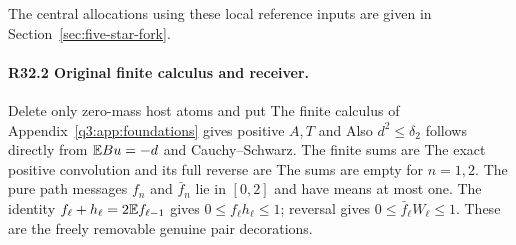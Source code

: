 The central allocations using these local reference inputs are
given in Section~\ref{sec:five-star-fork}.

\paragraph{R32.2 Original finite calculus and receiver.}
Delete only zero-mass host atoms and put
The finite calculus of Appendix~\ref{q3:app:foundations} gives positive \(A,\allowbreak T\) and
Also \(d^2\le\delta_2\) follows directly from \(\mathbb E Bu=-d\) and
Cauchy--Schwarz. The finite sums are
The exact positive convolution and its full reverse are
The sums are empty for \(n=1,\allowbreak 2\). The pure path messages \(f_n\) and \(\bar f_n\) lie in \([0,\allowbreak 2]\) and have means at most one. The identity \(f_\ell+h_\ell=2\mathbb E f_{\ell-1}\)
gives \(0\le f_\ell h_\ell\le1\); reversal gives
\(0\le\bar f_\ell W_\ell\le1\). These are the freely removable genuine
pair decorations.

